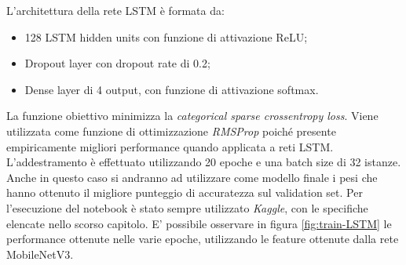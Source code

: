 \documentclass[11pt]{report}
\begin{document}
L'architettura della rete LSTM è formata da:
\begin{itemize}
    \item 128 LSTM hidden units con funzione di attivazione ReLU;
    
    \item Dropout layer con dropout rate di 0.2;
    
    \item Dense layer di 4 output, con funzione di attivazione softmax.
    
\end{itemize}

La funzione obiettivo minimizza la \textit{categorical sparse crossentropy loss}. Viene utilizzata come funzione di ottimizzazione \textit{RMSProp} \cite{tieleman2012rmsprop} poiché presente empiricamente migliori performance quando applicata a reti LSTM. L'addestramento è effettuato utilizzando 20 epoche e una batch size di 32 istanze. Anche in questo caso si andranno ad utilizzare come modello finale i pesi che hanno ottenuto il migliore punteggio di accuratezza sul validation set. Per l'esecuzione del notebook è stato sempre utilizzato \textit{Kaggle}, con le specifiche elencate nello scorso capitolo. E' possibile osservare in figura \ref{fig:train-LSTM} le performance ottenute nelle varie epoche, utilizzando le feature ottenute dalla rete MobileNetV3.
\end{document}
